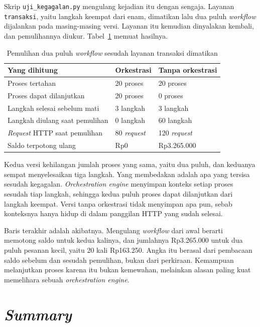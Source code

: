 Skrip \texttt{uji\_kegagalan.py} mengulang kejadian itu dengan sengaja.
Layanan \texttt{transaksi}, yaitu langkah keempat dari enam, dimatikan lalu dua
puluh \textit{workflow} dijalankan pada masing-masing versi. Layanan itu kemudian
dinyalakan kembali, dan pemulihannya diukur. Tabel~\ref{tab:kegagalan-odsoa} memuat
hasilnya.

\begin{table}[htbp]
  \centering
  \caption{Pemulihan dua puluh \textit{workflow} sesudah layanan transaksi dimatikan}
  \label{tab:kegagalan-odsoa}
  \begin{tabularx}{\textwidth}{|X|l|l|}
    \hline
    \textbf{Yang dihitung} & \textbf{Orkestrasi} & \textbf{Tanpa orkestrasi} \\
    \hline
    Proses tertahan & 20 proses & 20 proses \\
    \hline
    Proses dapat dilanjutkan & 20 proses & 0 proses \\
    \hline
    Langkah selesai sebelum mati & 3 langkah & 3 langkah \\
    \hline
    Langkah diulang saat pemulihan & 0 langkah & 60 langkah \\
    \hline
    \textit{Request} HTTP saat pemulihan & 80 \textit{request} & 120 \textit{request} \\
    \hline
    Saldo terpotong ulang & Rp0 & Rp3.265.000 \\
    \hline
  \end{tabularx}
\end{table}

Kedua versi kehilangan jumlah proses yang sama, yaitu dua puluh, dan keduanya
sempat menyelesaikan tiga langkah. Yang membedakan adalah apa yang tersisa
sesudah kegagalan. \textit{Orchestration engine} menyimpan konteks setiap proses sesudah
tiap langkah, sehingga kedua puluh proses dapat dilanjutkan dari langkah
keempat. Versi tanpa orkestrasi tidak menyimpan apa pun, sebab konteksnya hanya
hidup di dalam panggilan HTTP yang sudah selesai.

Baris terakhir adalah akibatnya. Mengulang \textit{workflow} dari awal berarti
memotong saldo untuk kedua kalinya, dan jumlahnya Rp3.265.000 untuk dua
puluh pesanan kecil, yaitu 20 kali Rp163.250. Angka itu berasal dari pembacaan saldo sebelum dan sesudah
pemulihan, bukan dari perkiraan. Kemampuan melanjutkan proses karena itu bukan
kemewahan, melainkan alasan paling kuat memelihara sebuah
\textit{orchestration engine}.

\section{\textit{Summary}}

